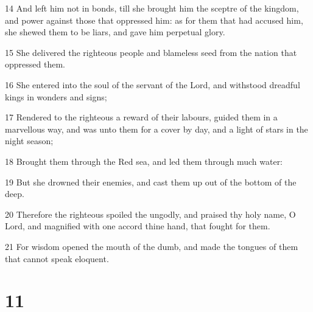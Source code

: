 \par 14 And left him not in bonds, till she brought him the sceptre of the kingdom, and power against those that oppressed him: as for them that had accused him, she shewed them to be liars, and gave him perpetual glory.
\par 15 She delivered the righteous people and blameless seed from the nation that oppressed them.
\par 16 She entered into the soul of the servant of the Lord, and withstood dreadful kings in wonders and signs;
\par 17 Rendered to the righteous a reward of their labours, guided them in a marvellous way, and was unto them for a cover by day, and a light of stars in the night season;
\par 18 Brought them through the Red sea, and led them through much water:
\par 19 But she drowned their enemies, and cast them up out of the bottom of the deep.
\par 20 Therefore the righteous spoiled the ungodly, and praised thy holy name, O Lord, and magnified with one accord thine hand, that fought for them.
\par 21 For wisdom opened the mouth of the dumb, and made the tongues of them that cannot speak eloquent.

\chapter{11}

